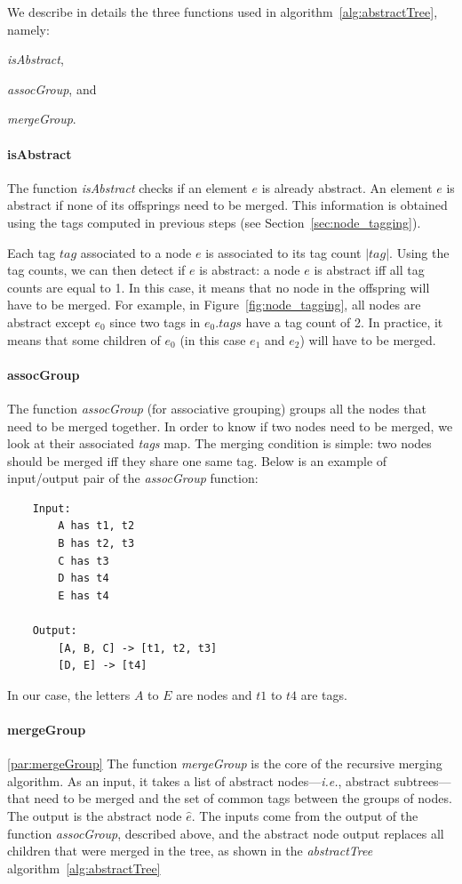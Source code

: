 We describe in details the three functions used in algorithm~\ref{alg:abstractTree}, namely:
\begin{inparaenum}
  \item \emph{isAbstract},
  \item \emph{assocGroup}, and
  \item \emph{mergeGroup}.
\end{inparaenum}

\paragraph{isAbstract}
The function \emph{isAbstract} checks if an element $e$ is already abstract.
An element $e$ is abstract if none of its offsprings need to be merged.
This information is obtained using the tags computed in previous steps (see Section~\ref{sec:node_tagging}).

Each tag $tag$ associated to a node $e$ is associated to its tag count $|tag|$.
Using the tag counts, we can then detect if $e$ is abstract: a node $e$ is abstract iff all tag counts are equal to 1.
In this case, it means that no node in the offspring will have to be merged.
For example, in Figure~\ref{fig:node_tagging}, all nodes are abstract except $e_{0}$ since two tags in $e_{0}.tags$ have a tag count of 2.
In practice, it means that some children of $e_{0}$ (in this case $e_{1}$ and $e_{2}$) will have to be merged.

\paragraph{assocGroup}\label{par:assocGroup}
The function \emph{assocGroup} (for associative grouping) groups all the nodes that need to be merged together.
In order to know if two nodes need to be merged, we look at their associated \emph{tags} map.
The merging condition is simple: two nodes should be merged iff they share one same tag.
Below is an example of input/output pair of the \emph{assocGroup} function:
\begin{lstlisting}
    Input:
        A has t1, t2
        B has t2, t3
        C has t3
        D has t4
        E has t4

    Output:
        [A, B, C] -> [t1, t2, t3]
        [D, E] -> [t4]
\end{lstlisting}

In our case, the letters $A$ to $E$ are nodes and $t1$ to $t4$ are tags.

\paragraph{mergeGroup}\ref{par:mergeGroup}
The function \emph{mergeGroup} is the core of the recursive merging algorithm.
As an input, it takes a list of abstract nodes---\emph{i.e.}, abstract subtrees---that need to be merged and the set of common tags between the groups of nodes.
The output is the abstract node $\hat{e}$.
The inputs come from the output of the function \emph{assocGroup}, described above, and the abstract node output replaces all children that were merged in the tree, as shown in the \emph{abstractTree} algorithm~\ref{alg:abstractTree}

